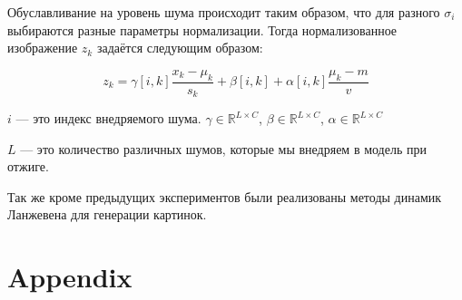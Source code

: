\documentclass{article}
\begin{document}
Обуславливание на уровень шума происходит таким образом, что для разного $\sigma_i$ выбираются разные
параметры нормализации. Тогда нормализованное изображение $z_k$ задаётся следующим образом:

\[
z_k = \gamma[i, k] \frac{x_k - \mu_k}{s_k} + \beta[i,k] + \alpha[i,k]\frac{\mu_k - m}{v}
\]

$i$ --- это индекс внедряемого шума.
$\gamma \in \mathbb{R}^{L \times C}$, $\beta \in \mathbb{R}^{L \times C}$, $\alpha \in \mathbb{R}^{L \times C}$

$L$ --- это количество различных шумов, которые мы внедряем в модель при отжиге.

Так же кроме предыдущих экспериментов были реализованы методы динамик Ланжевена для генерации картинок.



 
 

\section{Appendix}
\end{document}
